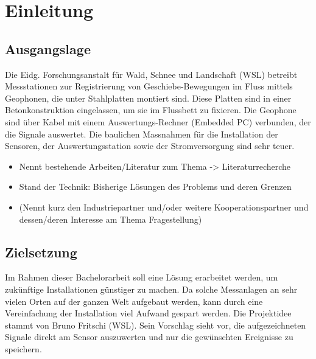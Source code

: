 %
%

\chapter{Einleitung}\label{chap.einleitung}



\section{Ausgangslage}\label{ausgangslage}
Die Eidg. Forschungsanstalt für Wald, Schnee und Landschaft (WSL) betreibt Messstationen zur Registrierung von Geschiebe-Bewegungen im Fluss mittels Geophonen, die unter Stahlplatten montiert sind. Diese Platten sind in einer Betonkonstruktion eingelassen, um sie im Flussbett zu fixieren. Die Geophone sind über Kabel mit einem Auswertungs-Rechner (Embedded PC) verbunden, der die Signale auswertet. Die baulichen Massnahmen für die Installation der Sensoren, der Auswertungsstation sowie der Stromversorgung sind sehr teuer. 

\begin{itemize}
\item Nennt bestehende Arbeiten/Literatur zum Thema -> Literaturrecherche
\item Stand der Technik: Bisherige Lösungen des Problems und deren Grenzen
\item (Nennt kurz den Industriepartner und/oder weitere Kooperationspartner und dessen/deren Interesse am Thema Fragestellung)
\end{itemize}



\section{Zielsetzung}\label{zielsetzung}
Im Rahmen dieser Bachelorarbeit soll eine Lösung erarbeitet werden, um zukünftige Installationen günstiger zu machen. Da solche Messanlagen an sehr vielen Orten auf der ganzen Welt aufgebaut werden, kann durch eine Vereinfachung der Installation viel Aufwand gespart werden. Die Projektidee stammt von Bruno Fritschi (WSL). Sein Vorschlag sieht vor, die aufgezeichneten Signale direkt am Sensor auszuwerten und nur die gewünschten Ereignisse zu speichern.

